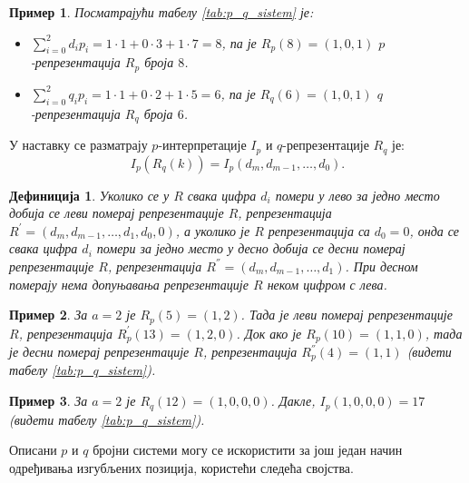 \documentclass[a4paper]{article}
\newtheorem{example}{Пример}
\newtheorem{definition}{Дефиниција}
\begin{document}
\begin{example}
	Посматрајући табелу \ref{tab:p_q_sistem} је:
		\begin{itemize}
			\item $ \sum_{i=0}^{2} d_{i}p_{i} = 1 \cdot 1 + 0 \cdot 3 + 1 \cdot 7 = 8 $, па је $ R_{p}(8) = (1, 0, 1) $ $ p $-репрезентација $ R_{p} $ броја $ 8 $. 
			\item $ \sum_{i=0}^{2} q_{i}p_{i} = 1 \cdot 1 + 0 \cdot 2 + 1 \cdot 5 = 6 $, па је $ R_{q}(6) = (1, 0, 1) $ $ q $-репрезентација $ R_{q} $ броја $ 6 $.
		\end{itemize}
\end{example}

У наставку се разматрају $ p $-интерпретације $ I_{p} $ и $ q $-репрезентације $ R_{q} $ је:
	\begin{displaymath}
		I_{p}(R_{q}(k)) = I_{p}(d_{m}, d_{m-1}, \ldots, d_{0}).
	\end{displaymath}

\begin{definition}
	Уколико се у $ R $ свака цифра $ d_{i} $ помери у лево за једно место добија се  леви померај репрезентације $ R $, репрезентација $ R^{'} = (d_{m}, d_{m-1}, \ldots , d_{1}, d_{0}, 0) $, а уколико је $ R $ репрезентација  са $ d_{0} = 0 $, онда се свака цифра $ d_{i} $ помери за једно место у десно добија се десни померај репрезентације $ R $, репрезентација $ R^{''} = (d_{m}, d_{m-1}, \ldots , d_{1}) $. При десном померају нема допуњавања репрезентације $ R $ неком цифром с лева.
\end{definition}

\begin{example}
	За $ a = 2 $ је $ R_{p}(5) = (1, 2) $. Тада је леви померај репрезентације $ R $, репрезентација $ R^{'}_{p}(13) = (1, 2, 0) $. Док ако је $ R_{p}(10) = (1, 1, 0) $, тада је десни померај репрезентације $ R $, репрезентација $ R^{''}_{p}(4) = (1, 1) $ (видети табелу \ref{tab:p_q_sistem}).
\end{example}

\begin{example}
	За $ a = 2 $ је $ R_{q}(12) = (1, 0, 0, 0) $. Дакле, $ I_{p}(1, 0, 0, 0) = 17 $ (видети табелу \ref{tab:p_q_sistem}).
\end{example}

Описани $ p $ и $ q $ бројни системи могу се искористити за још један начин одређивања изгубљених позиција, користећи следећа својства.
\end{document}
